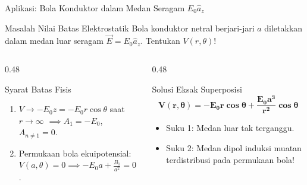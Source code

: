 \documentclass[aspectratio=169,10pt]{beamer}
\begin{document}
\begin{frame}{Aplikasi: Bola Konduktor dalam Medan Seragam $E_0 \hat{a}_z$}
  \begin{exampleblock}{Masalah Nilai Batas Elektrostatik}
    Bola konduktor netral berjari-jari $a$ diletakkan dalam medan luar seragam $\vec{E} = E_0 \hat{a}_z$. Tentukan $V(r, \theta)$!
  \end{exampleblock}
  \vspace{-0.05cm}
  \begin{columns}[t]
    \begin{column}{0.48\textwidth}
      \begin{block}{Syarat Batas Fisis}
        \small
        \begin{enumerate}
          \item $V \to -E_0 z = -E_0 r\cos\theta$ saat $r \to \infty$ $\implies A_1 = -E_0$, $A_{n \ne 1} = 0$.
          \item Permukaan bola ekuipotensial:\\
          $V(a, \theta) = 0 \implies -E_0 a + \frac{B_1}{a^2} = 0 \implies B_1 = E_0 a^3$.
        \end{enumerate}
      \end{block}
    \end{column}
    \begin{column}{0.48\textwidth}
      \begin{alertblock}{Solusi Eksak Superposisi}
        \small
        \begin{equation*}
          \mathbf{V(r, \theta) = -E_0 r\cos\theta + \frac{E_0 a^3}{r^2}\cos\theta}
        \end{equation*}
        \begin{itemize}
          \item Suku 1: Medan luar tak terganggu.
          \item Suku 2: Medan dipol induksi muatan terdistribusi pada permukaan bola!
        \end{itemize}
      \end{alertblock}
    \end{column}
  \end{columns}
\end{frame}
\end{document}
